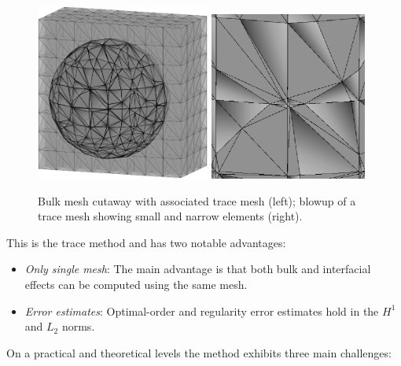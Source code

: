 \begin{figure}[ht!]
\centerline{\includegraphics[width=0.51\textwidth]{trace_cutaway}
\includegraphics[width=0.46\textwidth]{trace_blowup}}
\caption{Bulk mesh cutaway with associated trace mesh (left); blowup of a trace mesh showing small and narrow elements (right).  
} \label{f:tracemeshes}
\end{figure}

This is the trace method and has two notable advantages:

\begin{itemize}
\item
{\it Only single mesh}: The main advantage is that both bulk and
interfacial effects can be computed using the same mesh.

\item
{\it Error estimates}: 
Optimal-order and regularity error estimates hold in the $H^1$ and $L_2$ norms.
\end{itemize}

\noindent
On a practical and theoretical levels the method exhibits three main challenges:

